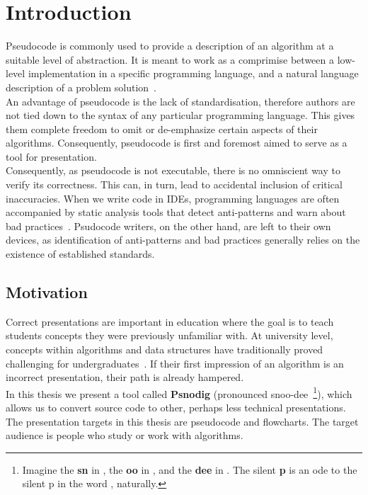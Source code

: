 \chapter{Introduction}

Pseudocode is commonly used to provide a description of an algorithm at a suitable level of abstraction. It is meant to work as a comprimise between a low-level implementation in a specific programming language, and a natural language description of a problem solution~\cite{whatIsPseudocode}. \\

An advantage of pseudocode is the lack of standardisation, therefore authors are not tied down to the syntax of any particular programming language. This gives them complete freedom to omit or de-emphasize certain aspects of their algorithms. Consequently, pseudocode is first and foremost aimed to serve as a tool for presentation. \\

Consequently, as pseudocode is not executable, there is no omniscient way to verify its correctness. This can, in turn, lead to accidental inclusion of critical inaccuracies. %
When we write code in IDEs, programming languages are often accompanied by static analysis tools that detect anti-patterns and warn about bad practices~\cite{manyLinters, whatIsALinter}. Psudocode writers, on the other hand, are left to their own devices, as identification of anti-patterns and bad practices generally relies on the existence of established standards. \\


\section{Motivation}

Correct presentations are important in education where the goal is to teach students concepts they were previously unfamiliar with. At university level, concepts within algorithms and data structures have traditionally proved challenging for undergraduates~\cite{algorithmsAreHard1, algorithmsAreHard2, algorithmsAreHard3}. If their first impression of an algorithm is an incorrect presentation, their path is already hampered. \\

In this thesis we present a tool called \textbf{Psnodig} (pronounced snoo-dee~\footnote{Imagine the \textbf{sn} in , the \textbf{oo} in , and the \textbf{dee} in . The silent \textbf{p} is an ode to the silent p in the word , naturally.}), which allows us to convert source code to other, perhaps less technical presentations. The presentation targets in this thesis are pseudocode and flowcharts. The target audience is people who study or work with algorithms. \\

